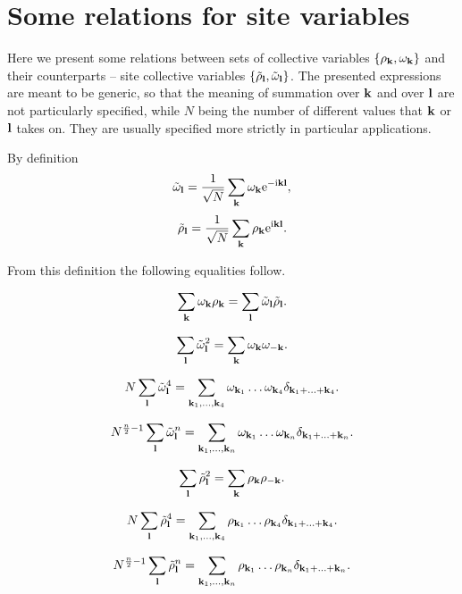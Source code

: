 \section{Some relations for site variables}

Here we present some relations between sets of collective variables $\{\rho_{\vb k}, \omega_{\vb k}\}$ and their counterparts -- site collective variables $\{\tilde{\rho}_{\vb l}, \tilde{\omega}_{\vb l}\}$. The presented expressions are meant to be generic, so that the meaning of summation over $\vb k$ and over $\vb l$ are not particularly specified, while $N$ being the number of different values that $\vb k$ or $\vb l$ takes on. They are usually specified more strictly in particular applications.

By definition
\begin{equation*}
	\tilde{\omega}_{\vb l} = \frac{1}{\sqrt{N}} \sum_{\vb k} \omega_{\vb k} {\rm e}^{-{\rm i}{\vb k}{\vb l}},
\end{equation*}
\begin{equation*}
	\tilde{\rho}_{\vb l} = \frac{1}{\sqrt{N}} \sum_{\vb k} \rho_{\vb k} {\rm e}^{{\rm i} {\vb k} {\vb l}}.
\end{equation*}

From this definition the following equalities follow.

\begin{equation*}
	\sum_{\vb k} \omega_{\vb k} \rho_{\vb k} = \sum_{\vb l} \tilde{\omega}_{\vb l} \tilde{\rho}_{\vb l}.
\end{equation*}

\begin{equation*}
	\sum_{\vb l} \tilde{\omega}_{\vb l}^2 = \sum_{\vb k} \omega_{\vb k} \omega_{-\vb k}.
\end{equation*}

\begin{equation*}
	N \sum_{\vb l} \tilde{\omega}_{\vb l}^4 = \sum_{\vb k_1, \dotsc, \vb k_4} \omega_{\vb k_1} \dotsc \omega_{\vb k_4} \delta_{\vb{k}_1 + \dotsc + \vb{k}_4}.
\end{equation*}

\begin{equation*}
	N^{\frac{n}{2} - 1} \sum_{\vb l} \tilde{\omega}_{\vb l}^n = \sum_{\vb k_1, \dotsc, \vb k_n} \omega_{\vb k_1} \dotsc \omega_{\vb k_n} \delta_{\vb{k}_1 + \dotsc + \vb{k}_n}.
\end{equation*}

\begin{equation*}
	\sum_{\vb l} \tilde{\rho}_{\vb l}^2 = \sum_{\vb k} \rho_{\vb k} \rho_{-\vb k}.
\end{equation*}

\begin{equation*}
	N \sum_{\vb l} \tilde{\rho}_{\vb l}^4 = \sum_{\vb k_1, \dotsc, \vb k_4} \rho_{\vb k_1} \dotsc \rho_{\vb k_4} \delta_{\vb{k}_1 + \dotsc + \vb{k}_4}.
\end{equation*}

\begin{equation*}
	N^{\frac{n}{2} - 1} \sum_{\vb l} \tilde{\rho}_{\vb l}^n = \sum_{\vb k_1, \dotsc, \vb k_n} \rho_{\vb k_1} \dotsc \rho_{\vb k_n} \delta_{\vb{k}_1 + \dotsc + \vb{k}_n}.
\end{equation*}
